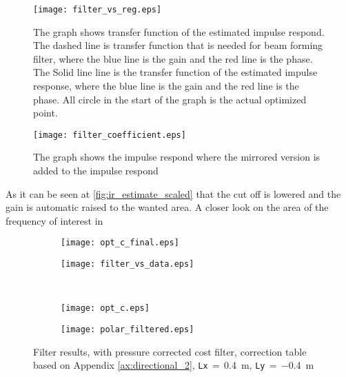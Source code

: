  

\begin{figure}[H]
	\centering
	\texttt{[image: filter\_vs\_reg.eps]}
	\caption{The graph shows transfer function of the estimated impulse respond. The dashed line is transfer function that is needed for beam forming filter, where the blue line is the gain and the red line is the phase. The Solid line line is the transfer function of the estimated impulse response, where the blue line is the gain and the red line is the phase. All circle in the start of the graph is the actual optimized point.}
		\label{fig:filter_vs_reg}
\end{figure}

\begin{figure}[H]
	\centering
	\texttt{[image: filter\_coefficient.eps]}
	\caption{The graph shows the impulse respond where the mirrored version is added to the impulse respond}
		\label{fig:filter_coefficient}
\end{figure}

As it can be seen at \autoref{fig:ir_estimate_scaled} that the cut off is lowered and the gain is automatic raised to the wanted area. A closer look on the area of the frequency of interest in 


\begin{figure}[H]
\begin{subfigure}[c]{0.5\textwidth}
\texttt{[image: opt\_c\_final.eps]}
\label{fig:opt_res_a}
\end{subfigure}
\begin{subfigure}[c]{0.5\textwidth}
\texttt{[image: filter\_vs\_data.eps]}
\label{fig:filter_vs_data}
\end{subfigure}\\
\hspace{0.1\textheight}
\begin{subfigure}[c]{0.5\textwidth}
\texttt{[image: opt\_c.eps]}
\label{fig:opt_res_c}
\end{subfigure}
\begin{subfigure}[c]{0.5\textwidth}
\texttt{[image: polar\_filtered.eps]}
\label{fig:polar_filtered}
\end{subfigure}
\caption{Filter results, with pressure corrected cost filter, correction table based on Appendix \ref{ax:directional_2}, \textcolor{green3}{\texttt{Lx}}\,$=$\,\SI{0.4}{\meter}, \textcolor{green3}{\texttt{Ly}}\,$=\,$\SI{-0.4}{\meter}}
		\label{fig:opt_res}
\end{figure}


